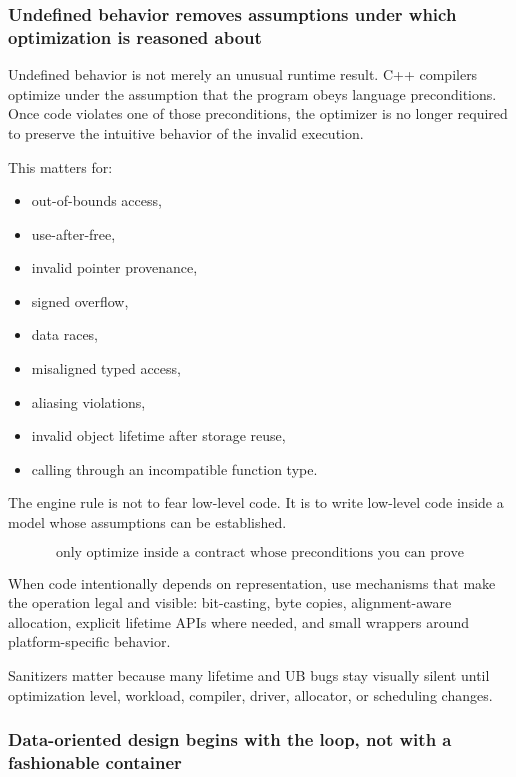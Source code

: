 \subsubsection{Undefined behavior removes assumptions under which optimization is reasoned about}\label{01-foundations-i-ch005-undefined-behavior-removes-assumptions-under-which-optimization-is-reasoned-about}

\hypertarget{01-foundations-i-ch005-undefined-behavior-removes-assumptions-under-which-optimization-is-reasoned-about}{}

Undefined behavior is not merely an unusual runtime result. C++ compilers optimize under the assumption that the program obeys language preconditions. Once code violates one of those preconditions, the optimizer is no longer required to preserve the intuitive behavior of the invalid execution.

This matters for:

\begin{itemize}
\tightlist
\item
  out-of-bounds access,
\item
  use-after-free,
\item
  invalid pointer provenance,
\item
  signed overflow,
\item
  data races,
\item
  misaligned typed access,
\item
  aliasing violations,
\item
  invalid object lifetime after storage reuse,
\item
  calling through an incompatible function type.
\end{itemize}

The engine rule is not to fear low-level code. It is to write low-level code inside a model whose assumptions can be established.

\[
\boxed{
\text{only optimize inside a contract whose preconditions you can prove}
}
\]

When code intentionally depends on representation, use mechanisms that make the operation legal and visible: bit-casting, byte copies, alignment-aware allocation, explicit lifetime APIs where needed, and small wrappers around platform-specific behavior.

Sanitizers matter because many lifetime and UB bugs stay visually silent until optimization level, workload, compiler, driver, allocator, or scheduling changes.

\subsubsection{Data-oriented design begins with the loop, not with a fashionable container}\label{01-foundations-i-ch005-data-oriented-design-begins-with-the-loop-not-with-a-fashionable-container}

